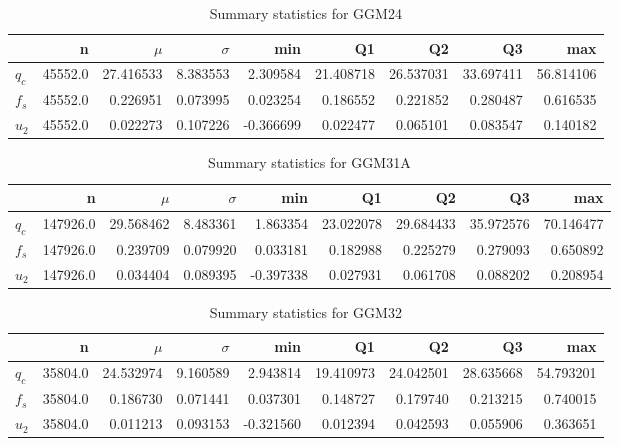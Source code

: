 \begin{table}[h]
\caption{Summary statistics for GGM24}
\begin{tabular}{lrrrrrrrr}
\toprule
{} &        n &      $\mu$ &  $\sigma$ &       min &         Q1 &         Q2 &         Q3 &        max \\
\midrule
$q_c$ &  45552.0 &  27.416533 &  8.383553 &  2.309584 &  21.408718 &  26.537031 &  33.697411 &  56.814106 \\
$f_s$ &  45552.0 &   0.226951 &  0.073995 &  0.023254 &   0.186552 &   0.221852 &   0.280487 &   0.616535 \\
$u_2$ &  45552.0 &   0.022273 &  0.107226 & -0.366699 &   0.022477 &   0.065101 &   0.083547 &   0.140182 \\
\bottomrule
\end{tabular}
\end{table}

\begin{table}[h]
\caption{Summary statistics for GGM31A}
\begin{tabular}{lrrrrrrrr}
\toprule
{} &         n &      $\mu$ &  $\sigma$ &       min &         Q1 &         Q2 &         Q3 &        max \\
\midrule
$q_c$ &  147926.0 &  29.568462 &  8.483361 &  1.863354 &  23.022078 &  29.684433 &  35.972576 &  70.146477 \\
$f_s$ &  147926.0 &   0.239709 &  0.079920 &  0.033181 &   0.182988 &   0.225279 &   0.279093 &   0.650892 \\
$u_2$ &  147926.0 &   0.034404 &  0.089395 & -0.397338 &   0.027931 &   0.061708 &   0.088202 &   0.208954 \\
\bottomrule
\end{tabular}
\end{table}

\begin{table}[h]
\caption{Summary statistics for GGM32}
\begin{tabular}{lrrrrrrrr}
\toprule
{} &        n &      $\mu$ &  $\sigma$ &       min &         Q1 &         Q2 &         Q3 &        max \\
\midrule
$q_c$ &  35804.0 &  24.532974 &  9.160589 &  2.943814 &  19.410973 &  24.042501 &  28.635668 &  54.793201 \\
$f_s$ &  35804.0 &   0.186730 &  0.071441 &  0.037301 &   0.148727 &   0.179740 &   0.213215 &   0.740015 \\
$u_2$ &  35804.0 &   0.011213 &  0.093153 & -0.321560 &   0.012394 &   0.042593 &   0.055906 &   0.363651 \\
\bottomrule
\end{tabular}
\end{table}

